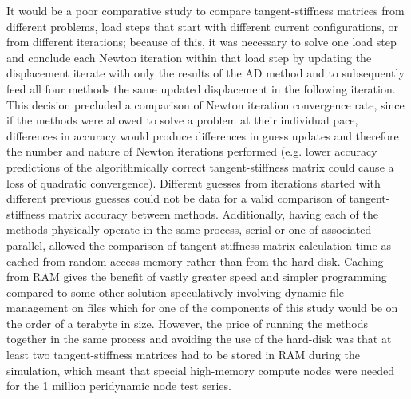 \documentclass[preprint,12pt]{elsarticle}
\begin{document}
It would be a poor comparative study to compare tangent-stiffness matrices from
different problems, load steps that start with different current
configurations, or from different iterations; because of this, it was necessary
to solve one load step and conclude each Newton iteration within that load step
by updating the displacement iterate with only the results of the AD method and
to subsequently feed all four methods the same updated displacement in the
following iteration. This decision precluded a comparison of Newton iteration
convergence rate, since if the methods were allowed to solve a problem at their
individual pace, differences in accuracy would produce differences in guess
updates and therefore the number and nature of Newton iterations performed
(e.g. lower accuracy predictions of the algorithmically correct
tangent-stiffness matrix could cause a loss of quadratic convergence).  Different
guesses from iterations started with different previous guesses could not be
data for a valid comparison of tangent-stiffness matrix accuracy between methods.
Additionally, having each of the methods physically operate in the same
process, serial or one of associated parallel, allowed the comparison of
tangent-stiffness matrix calculation time as cached from random access memory
rather than from the hard-disk.  Caching from RAM gives the benefit of vastly
greater speed and simpler programming compared to some other solution
speculatively involving dynamic file management on files which for one of the
components of this study would be on the order of a terabyte in size. However,
the price of running the methods together in the same process and avoiding the
use of the hard-disk was that at least two tangent-stiffness matrices had to be
stored in RAM during the simulation, which meant that special high-memory
compute nodes were needed for the 1 million peridynamic node test series.
\end{document}
